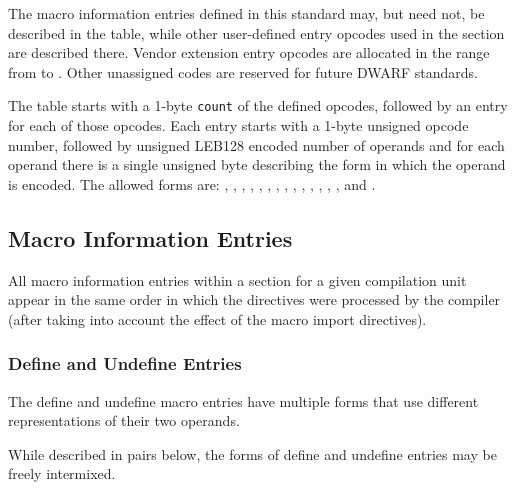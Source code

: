 \begin{enumerate}[1. ]
The macro information entries defined in this standard may, but need not, be
described in the table, while other user-defined entry opcodes used in the section
are described there.  Vendor extension entry opcodes are
allocated in the range from \DWMACROlouser{} to \DWMACROhiuser. Other
unassigned codes are reserved for future DWARF standards.

The table starts with a 1-byte \texttt{count} of the defined opcodes, followed by
an entry for each of those opcodes.  Each entry starts with a 1-byte unsigned
opcode number, followed by unsigned LEB128 encoded number of operands
and for each operand there is a single unsigned byte describing the form in which
the operand is encoded.  The allowed forms are: 
\DWFORMblock, \DWFORMblockone, \DWFORMblocktwo, \DWFORMblockfour,
\DWFORMdataone, \DWFORMdatatwo, \DWFORMdatafour, \DWFORMdataeight, 
\DWFORMdatasixteen, \DWFORMsdata, \DWFORMudata, \DWFORMflag, \DWFORMsecoffset,
\DWFORMstring, \DWFORMstrp{} and \DWFORMstrx.
\end{enumerate}

\subsection{Macro Information Entries}
\label{chap:macroinformationentries}
All macro information entries within a \dotdebugmacro{}
section for a given compilation unit appear in the same 
order in which the directives were processed by the 
compiler (after taking into account the effect of the
macro import directives).


\subsubsection{Define and Undefine Entries}
\label{chap:defineandundefineentries}
The define and undefine macro entries have multiple forms that
use different representations of their two operands.

While described in pairs below, the forms of define 
and undefine entries may be freely intermixed.

